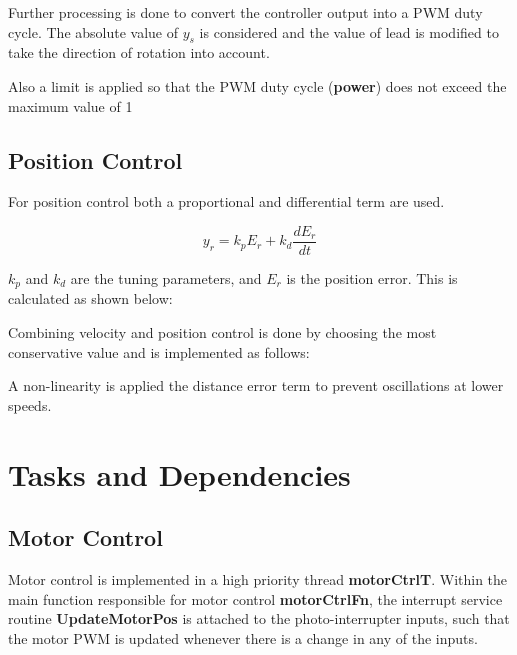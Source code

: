 \documentclass{article}
\begin{document}
\bigskip




\bigskip

Further processing is done to convert the controller output into a PWM duty cycle. The absolute value of \(y_s\) is considered and the value of lead is modified to take the direction of rotation into account.

\bigskip



\bigskip

Also a limit is applied so that the PWM duty cycle (\textbf{power}) does not exceed the maximum value of 1

\bigskip



\bigskip

\subsection{Position Control}

For position control both a proportional and differential term are used.

\[y_r = k_pE_r + k_d \frac{dE_r}{dt}\]

\(k_p\) and \(k_d\) are the tuning parameters, and \(E_r\) is the position error. This is calculated as shown below:

\bigskip

\bigskip

Combining velocity and position control is done by choosing the most conservative value and is implemented as follows:

\bigskip

\bigskip

A non-linearity is applied the distance error term to prevent oscillations at lower speeds.

\section{Tasks and Dependencies}
\subsection{Motor Control}

Motor control is implemented in a high priority thread \textbf{motorCtrlT}. Within the main function responsible for motor control \textbf{motorCtrlFn}, the interrupt service routine \textbf{UpdateMotorPos} is attached to the photo-interrupter inputs, such that the motor PWM is updated whenever there is a change in any of the inputs.
\end{document}
